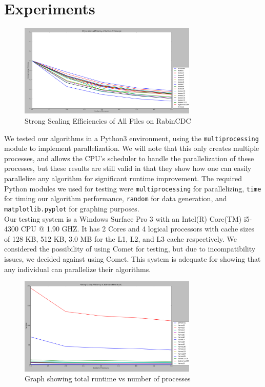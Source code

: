 \documentclass{acmtog} %
\begin{document}
	\section{Experiments}
		\begin{figure}
			\centerline{\includegraphics[width=8.5cm]{img/StrongScalingAllFiles}}
			\caption{Strong Scaling Efficiencies of All Files on RabinCDC}
			\label{fig:strongscale}
		\end{figure}
	We tested our algorithms in a Python3 environment, using the \texttt{multiprocessing} module to implement parallelization. We will note that this only creates multiple processes, and allows the CPU's scheduler to handle the parallelization of these processes, but these results are still valid in that they show how one can easily parallelize any algorithm for significant runtime improvement. The required Python modules we used for testing were \texttt{multiprocessing} for parallelizing, \texttt{time} for timing our algorithm performance, \texttt{random} for data generation, and \texttt{matplotlib.pyplot} for graphing purposes. \\
	
	Our testing system is a Windows Surface Pro 3 with an Intel(R) Core(TM) i5-4300 CPU @ 1.90 GHZ. It has 2 Cores and 4 logical processors with cache sizes of 128 KB, 512 KB, 3.0 MB for the L1, L2, and L3 cache respectively. We considered the possibility of using Comet for testing, but due to incompatibility issues, we decided against using Comet. This system is adequate for showing that any individual can parallelize their algorithms. \\

	
	
		\begin{figure}
			\centerline{\includegraphics[width=8.5cm]{img/AllTimesvsProcess}}
			\caption{Graph showing total runtime vs number of processes}
			\label{fig:runtimecomparisons}
		\end{figure}
\end{document}
